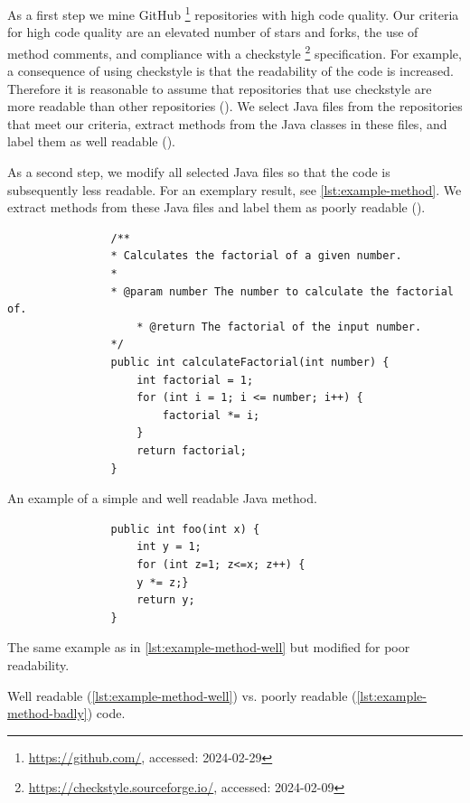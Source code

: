 \documentclass[%
class=scrreprt,
chapterprefix=false,%
open=right,%
twoside=true,%
paper=a4,%
logofile={Logo\_zentral\_farbig\_EN.png},%
thesistype=master,%
UKenglish,%
]{se2thesis}
\newcounter{urlfootnote}
\newcommand{\onecurl}[2]{%
	\stepcounter{urlfootnote}%
	\expandafter\def\csname urlfootnote:#1\endcsname{\theurlfootnote}%
	\footnote{\label{url:#1}\url{#1}, accessed: #2}%
}
\newcommand{\curl}[2]{%
		\onecurl{#1}{#2}%
}
\theoremstyle{definition}
\begin{document}
	As a first step
	we mine GitHub\curl{https://github.com/}{2024-02-29} repositories with high code quality.
	Our criteria for high code quality are an elevated number of stars and forks, the use of method comments, and compliance with a checkstyle\curl{https://checkstyle.sourceforge.io/}{2024-02-09} specification. For example, a consequence of using checkstyle is that the readability of the code is increased. Therefore it is reasonable to assume that repositories that use checkstyle are more readable than other repositories ().
	We select Java files from the repositories that meet our criteria, extract methods from the Java classes in these files, and label them as well readable ().
	
	As a second step, we modify all selected Java files so that the code is subsequently less readable. For an exemplary result, see \autoref{lst:example-method}.
	We extract methods from these Java files and label them as poorly readable ().
	
	\begin{listing}[tb]
		\begin{sublisting}{\linewidth}
			\begin{verbatim}
				/**
				* Calculates the factorial of a given number.
				*
				* @param number The number to calculate the factorial of.
					* @return The factorial of the input number.
				*/
				public int calculateFactorial(int number) {
					int factorial = 1;
					for (int i = 1; i <= number; i++) {
						factorial *= i;
					}
					return factorial;
				}
			\end{verbatim}
			\caption{An example of a simple and well readable Java method.}
			\label{lst:example-method-well}
		\end{sublisting}		
		\begin{sublisting}{\linewidth}
			\begin{verbatim}
				public int foo(int x) {
					int y = 1;
					for (int z=1; z<=x; z++) {
					y *= z;}
					return y;
				}
			\end{verbatim}
			\caption{The same example as in \autoref{lst:example-method-well} but modified for poor readability.}
			\label{lst:example-method-badly}
		\end{sublisting}
		\caption{Well readable (\autoref{lst:example-method-well}) vs. poorly readable (\autoref{lst:example-method-badly}) code.}
		\label{lst:example-method}
	\end{listing}
	
\end{document}
